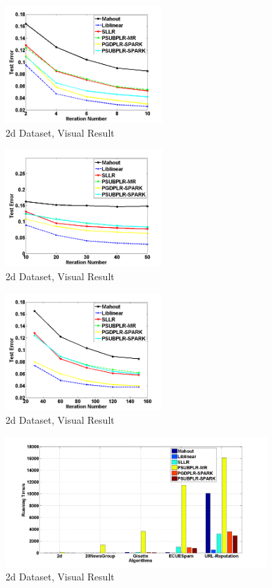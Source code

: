 \documentclass{llncs}
\begin{document}
\begin{figure}[tb] \label{fig:05}
\center \includegraphics[height=4.5cm,width=6cm]{img/Gisette_accuracy_iteration.png}
\caption{2d Dataset, Visual Result}
\end{figure}

\begin{figure}[tb] \label{fig:6}
\center \includegraphics[height=4.5cm,width=6cm]{img/ECUESpam_accuracy_iteration.png}
\caption{2d Dataset, Visual Result}
\end{figure}

\begin{figure}[tb] \label{fig:07}
\center \includegraphics[height=4.5cm,width=6cm]{img/URL-Reputation_accuracy_iteration.png}
\caption{2d Dataset, Visual Result}
\end{figure}


\begin{figure}[tb] \label{fig:08}
\center \includegraphics[height=5cm,width=10cm]{img/all_time.png}
\caption{2d Dataset, Visual Result}
\end{figure}
\end{document}
